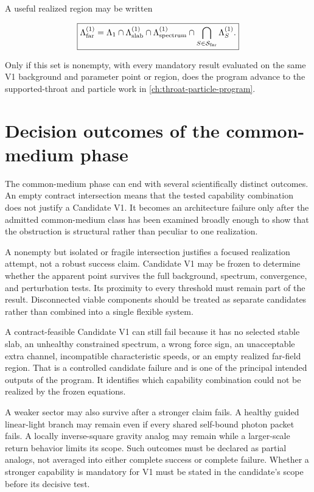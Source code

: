 A useful realized region may be written

\[
\boxed{
\Lambda_{\rm far}^{(1)}
=
\Lambda_1
\cap\Lambda_{\rm slab}^{(1)}
\cap\Lambda_{\rm spectrum}^{(1)}
\cap
\bigcap_{S\in\mathcal S_{\rm far}}
\Lambda_S^{(1)}.
}
\]

Only if this set is nonempty, with every mandatory result evaluated on the same
V1 background and parameter point or region, does the program advance to the
supported-throat and particle work in \cref{ch:throat-particle-program}.

\section{Decision outcomes of the common-medium phase}

The common-medium phase can end with several scientifically distinct outcomes.
An empty contract intersection means that the tested capability combination
does not justify a Candidate V1. It becomes an architecture failure only after
the admitted common-medium class has been examined broadly enough to show that
the obstruction is structural rather than peculiar to one realization.

A nonempty but isolated or fragile intersection justifies a focused realization
attempt, not a robust success claim. Candidate V1 may be frozen to determine
whether the apparent point survives the full background, spectrum, convergence,
and perturbation tests. Its proximity to every threshold must remain part of the
result. Disconnected viable components should be treated as separate candidates
rather than combined into a single flexible system.

A contract-feasible Candidate V1 can still fail because it has no selected
stable slab, an unhealthy constrained spectrum, a wrong force sign, an
unacceptable extra channel, incompatible characteristic speeds, or an empty
realized far-field region. That is a controlled candidate failure and is one of
the principal intended outputs of the program. It identifies which capability
combination could not be realized by the frozen equations.

A weaker sector may also survive after a stronger claim fails. A healthy guided
linear-light branch may remain even if every shared self-bound photon packet
fails. A locally inverse-square gravity analog may remain while a larger-scale
return behavior limits its scope. Such outcomes must be declared as partial
analogs, not averaged into either complete success or complete failure. Whether
a stronger capability is mandatory for V1 must be stated in the candidate's
scope before its decisive test.

